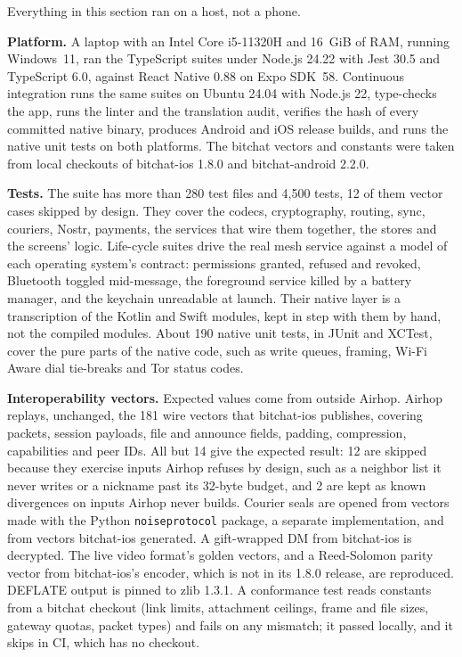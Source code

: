 \documentclass[conference]{IEEEtran}
\newcommand{\code}[1]{\texttt{#1}}
\begin{document}
Everything in this section ran on a host, not a phone.

\textbf{Platform.} A laptop with an Intel Core i5-11320H and 16~GiB of RAM, running Windows~11, ran the TypeScript suites under Node.js 24.22 with Jest 30.5 and TypeScript 6.0, against React Native 0.88 on Expo SDK~58. Continuous integration runs the same suites on Ubuntu 24.04 with Node.js 22, type-checks the app, runs the linter and the translation audit, verifies the hash of every committed native binary, produces Android and iOS release builds, and runs the native unit tests on both platforms. The bitchat vectors and constants were taken from local checkouts of bitchat-ios 1.8.0 and bitchat-android 2.2.0.

\textbf{Tests.} The suite has more than 280 test files and 4,500 tests, 12 of them vector cases skipped by design. They cover the codecs, cryptography, routing, sync, couriers, Nostr, payments, the services that wire them together, the stores and the screens' logic. Life-cycle suites drive the real mesh service against a model of each operating system's contract: permissions granted, refused and revoked, Bluetooth toggled mid-message, the foreground service killed by a battery manager, and the keychain unreadable at launch. Their native layer is a transcription of the Kotlin and Swift modules, kept in step with them by hand, not the compiled modules. About 190 native unit tests, in JUnit and XCTest, cover the pure parts of the native code, such as write queues, framing, Wi-Fi Aware dial tie-breaks and Tor status codes.

\textbf{Interoperability vectors.} Expected values come from outside Airhop. Airhop replays, unchanged, the 181 wire vectors that bitchat-ios publishes, covering packets, session payloads, file and announce fields, padding, compression, capabilities and peer IDs. All but 14 give the expected result: 12 are skipped because they exercise inputs Airhop refuses by design, such as a neighbor list it never writes or a nickname past its 32-byte budget, and 2 are kept as known divergences on inputs Airhop never builds. Courier seals are opened from vectors made with the Python \code{noiseprotocol} package, a separate implementation, and from vectors bitchat-ios generated. A gift-wrapped DM from bitchat-ios is decrypted. The live video format's golden vectors, and a Reed-Solomon parity vector from bitchat-ios's encoder, which is not in its 1.8.0 release, are reproduced. DEFLATE output is pinned to zlib 1.3.1. A conformance test reads constants from a bitchat checkout (link limits, attachment ceilings, frame and file sizes, gateway quotas, packet types) and fails on any mismatch; it passed locally, and it skips in CI, which has no checkout.
\end{document}
